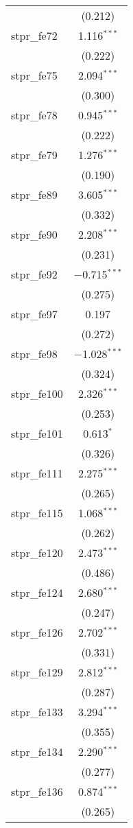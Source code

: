 \begin{table}[!htbp]
\begin{tabular}{@{\extracolsep{5pt}}lc}
  & (0.212) \\ 
  stpr\_fe72 & 1.116$^{***}$ \\ 
  & (0.222) \\ 
  stpr\_fe75 & 2.094$^{***}$ \\ 
  & (0.300) \\ 
  stpr\_fe78 & 0.945$^{***}$ \\ 
  & (0.222) \\ 
  stpr\_fe79 & 1.276$^{***}$ \\ 
  & (0.190) \\ 
  stpr\_fe89 & 3.605$^{***}$ \\ 
  & (0.332) \\ 
  stpr\_fe90 & 2.208$^{***}$ \\ 
  & (0.231) \\ 
  stpr\_fe92 & $-$0.715$^{***}$ \\ 
  & (0.275) \\ 
  stpr\_fe97 & 0.197 \\ 
  & (0.272) \\ 
  stpr\_fe98 & $-$1.028$^{***}$ \\ 
  & (0.324) \\ 
  stpr\_fe100 & 2.326$^{***}$ \\ 
  & (0.253) \\ 
  stpr\_fe101 & 0.613$^{*}$ \\ 
  & (0.326) \\ 
  stpr\_fe111 & 2.275$^{***}$ \\ 
  & (0.265) \\ 
  stpr\_fe115 & 1.068$^{***}$ \\ 
  & (0.262) \\ 
  stpr\_fe120 & 2.473$^{***}$ \\ 
  & (0.486) \\ 
  stpr\_fe124 & 2.680$^{***}$ \\ 
  & (0.247) \\ 
  stpr\_fe126 & 2.702$^{***}$ \\ 
  & (0.331) \\ 
  stpr\_fe129 & 2.812$^{***}$ \\ 
  & (0.287) \\ 
  stpr\_fe133 & 3.294$^{***}$ \\ 
  & (0.355) \\ 
  stpr\_fe134 & 2.290$^{***}$ \\ 
  & (0.277) \\ 
  stpr\_fe136 & 0.874$^{***}$ \\ 
  & (0.265) \\ 

\end{tabular}
\end{table}
